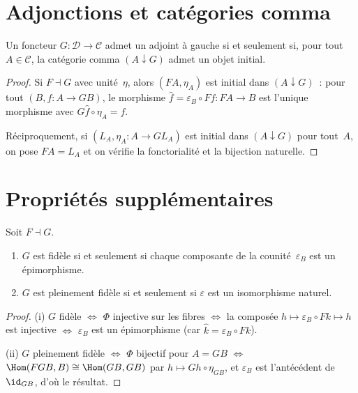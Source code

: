 \section{Adjonctions et catégories comma}\label{sec:adj-comma}

\begin{proposition}\label{prop:adj-objet-initial-comma}
Un foncteur $G\colon\mathcal{D}\to\mathcal{C}$ admet un adjoint à gauche
si et seulement si, pour tout $A\in\mathcal{C}$, la catégorie comma
$(A\downarrow G)$ admet un objet initial.
\end{proposition}

\begin{proof}
Si $F\dashv G$ avec unité~$\eta$, alors $(FA,\eta_A)$ est initial
dans $(A\downarrow G)$~: pour tout $(B,f\colon A\to GB)$, le morphisme
$\hat{f}=\varepsilon_B\circ Ff\colon FA\to B$ est l'unique morphisme
avec $G\hat{f}\circ\eta_A = f$.

Réciproquement, si $(L_A,\eta_A\colon A\to GL_A)$ est initial dans
$(A\downarrow G)$ pour tout~$A$, on pose $FA=L_A$ et on vérifie
la fonctorialité et la bijection naturelle.
\end{proof}


\section{Propriétés supplémentaires}\label{sec:adj-proprietes}

\begin{proposition}\label{prop:adj-pleinement-fidele}
Soit $F\dashv G$.
\begin{enumerate}[label=(\roman*)]
\item $G$ est fidèle si et seulement si chaque composante de la
      counité~$\varepsilon_B$ est un épimorphisme.
\item $G$ est pleinement fidèle si et seulement si $\varepsilon$
      est un isomorphisme naturel.
\end{enumerate}
\end{proposition}

\begin{proof}
(i) $G$ fidèle $\Leftrightarrow$ $\Phi$ injective sur les fibres
$\Leftrightarrow$ la composée $h\mapsto\varepsilon_B\circ Fk\mapsto h$
est injective
$\Leftrightarrow$ $\varepsilon_B$ est un épimorphisme (car $\hat{k}=\varepsilon_B\circ Fk$).

(ii) $G$ pleinement fidèle $\Leftrightarrow$ $\Phi$ bijectif pour $A=GB$
$\Leftrightarrow$ $\Hom(FGB,B)\cong\Hom(GB,GB)$ par $h\mapsto Gh\circ\eta_{GB}$,
et $\varepsilon_B$ est l'antécédent de $\id_{GB}$, d'où le résultat.
\end{proof}

